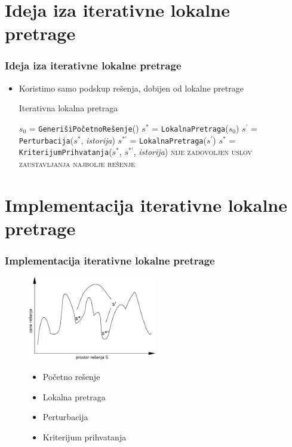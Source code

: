 \documentclass{beamer}
\newcommand{\sstar}[0]{$\textit{s}^*$}
\newcommand{\squote}[0]{$\textit{s}^\prime$}
\newcommand{\lokalna}[0]{\small{\texttt{LokalnaPretraga}}}
\newcommand{\kriterijum}[0]{\small{\texttt{KriterijumPrihvatanja}}}
\newcommand{\generisi}[0]{\small{\texttt{GenerišiPočetnoRešenje}}}
\newcommand{\perturbacija}[0]{\small{\texttt{Perturbacija}}}
\begin{document}
\section{Ideja iza iterativne lokalne pretrage}
\begin{frame}
	\frametitle{Ideja iza iterativne lokalne pretrage} 
  \begin{itemize}
    \item Koristimo samo podskup rešenja, dobijen od lokalne pretrage
    \begin{center}
      \begin{minipage}{1\linewidth}
        \begin{algorithm}[H]
      \caption{Iterativna lokalna pretraga}
      \label{alg:1}
      \begin{algorithmic}
      \STATE $\textit{s}_0$ = \generisi{}()
      \STATE \sstar{} = \lokalna{}($\textit{s}_0$)
      \REPEAT
      \STATE \squote{} = \perturbacija{}(\sstar{}, \textit{istorija})
      \STATE $\textit{s}^{*\prime}$ = \lokalna{}(\squote{})
      \STATE \sstar{} = \kriterijum{}(\sstar{}, $\textit{s}^{*\prime}$, \textit{istorija})
      \UNTIL \textsc{nije zadovoljen uslov zaustavljanja}\footnotemark
      \RETURN \textsc{najbolje rešenje}
      \end{algorithmic}
      \end{algorithm}
    \end{minipage}
    \end{center}
  \end{itemize}
\end{frame}

\section{Implementacija iterativne lokalne pretrage}
\begin{frame}[fragile]\frametitle{Implementacija iterativne lokalne pretrage}
  \begin{figure}[h!]
    \centering
    \includegraphics[width=0.5\textwidth]{slika.eps}
    \begin{itemize}
      \item Početno rešenje
      \item Lokalna pretraga
      \item Perturbacija
      \item Kriterijum prihvatanja
    \end{itemize}
  \end{figure}
\end{frame}
\end{document}
